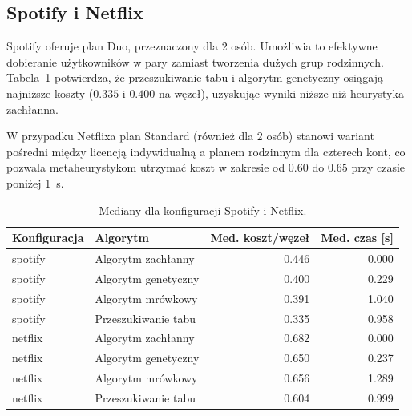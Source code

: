 \subsection{Spotify i Netflix}

Spotify oferuje plan Duo, przeznaczony dla 2 osób. Umożliwia to efektywne dobieranie użytkowników w pary zamiast tworzenia dużych grup rodzinnych. Tabela~\ref{tab:ext-additional-static} potwierdza, że przeszukiwanie tabu i algorytm genetyczny osiągają najniższe koszty ($0.335$ i $0.400$ na węzeł), uzyskując wyniki niższe niż heurystyka zachłanna.

W przypadku Netflixa plan Standard (również dla 2 osób) stanowi wariant pośredni między licencją indywidualną a planem rodzinnym dla czterech kont, co pozwala metaheurystykom utrzymać koszt w zakresie od $0.60$ do $0.65$ przy czasie poniżej 1~s.

\begin{table}[H]
  \centering
  \caption{Mediany dla konfiguracji Spotify i Netflix.}
  \label{tab:ext-additional-static}
  \begin{tabular}{llrr}
    \toprule
    \textbf{Konfiguracja} & \textbf{Algorytm}   & \textbf{Med. koszt/węzeł} & \textbf{Med. czas [s]} \\
    \midrule
    spotify               & Algorytm zachłanny  & 0.446                     & 0.000                  \\
    spotify               & Algorytm genetyczny & 0.400                     & 0.229                  \\
    spotify               & Algorytm mrówkowy   & 0.391                     & 1.040                  \\
    spotify               & Przeszukiwanie tabu & 0.335                     & 0.958                  \\
    netflix               & Algorytm zachłanny  & 0.682                     & 0.000                  \\
    netflix               & Algorytm genetyczny & 0.650                     & 0.237                  \\
    netflix               & Algorytm mrówkowy   & 0.656                     & 1.289                  \\
    netflix               & Przeszukiwanie tabu & 0.604                     & 0.999                  \\
  \end{tabular}
\end{table}

